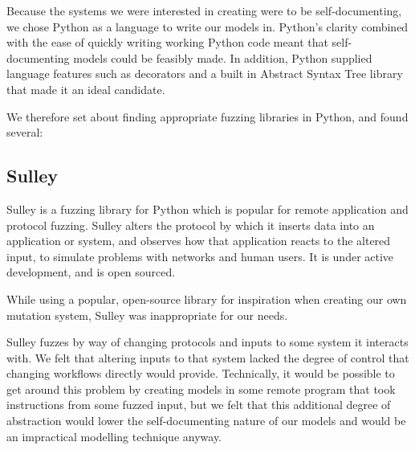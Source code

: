 \label{research_fuzzing}
Because the systems we were interested in creating were to be self-documenting, we chose Python as a language to write our models in. Python's clarity combined with the ease of quickly writing working Python code meant that self-documenting models could be feasibly made. In addition, Python supplied language features such as decorators and a built in Abstract Syntax Tree library that made it an ideal candidate. \par
We therefore set about finding appropriate fuzzing libraries in Python, and found several:
\subsection{Sulley}
\label{fuzzing_sulley}
Sulley is a fuzzing library for Python which is popular for remote application and protocol fuzzing. Sulley alters the protocol by which it inserts data into an application or system, and observes how that application reacts to the altered input, to simulate problems with networks and human users. It is under active development, and is open sourced.\par
While using a popular, open-source library for inspiration when creating our own mutation system, Sulley was inappropriate for our needs.\par
Sulley fuzzes by way of changing protocols and inputs to some system it interacts with. We felt that altering inputs to that system lacked the degree of control that changing workflows directly would provide. Technically, it would be possible to get around this problem by creating models in some remote program that took instructions from some fuzzed input, but we felt that this additional degree of abstraction would lower the self-documenting nature of our models and would be an impractical modelling technique anyway. \par

